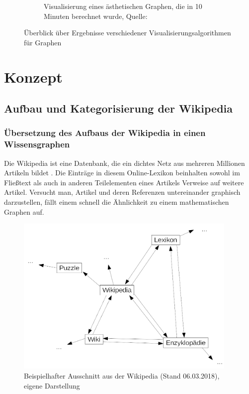 \documentclass[12pt, a4paper]{article}
\begin{document}
\begin{figure}[h!]
\begin{subfigure}[b]{0.45\textwidth}
\caption[Visualisierung eines ästhetischen Graphen, die in 10 Minuten berechnet wurde]{Visualisierung eines ästhetischen Graphen, die in 10 Minuten berechnet wurde, Quelle: \protect{}}
\label{Davidson_Harel_G1_10min}
\end{subfigure}
\caption{Überblick über Ergebnisse verschiedener Visualisierungsalgorithmen für Graphen}
\end{figure}

\newpage
\section{Konzept}
\subsection{Aufbau und Kategorisierung der Wikipedia}
\subsubsection{Übersetzung des Aufbaus der Wikipedia in einen Wissensgraphen}
Die Wikipedia ist eine Datenbank, die ein dichtes Netz aus mehreren Millionen Artikeln bildet \cite{Wiki:02}. Die Einträge in diesem Online-Lexikon beinhalten sowohl im Fließtext als auch in anderen Teilelementen eines Artikels Verweise auf weitere Artikel. Versucht man, Artikel und deren Referenzen untereinander graphisch darzustellen, fällt einem schnell die Ähnlichkeit zu einem mathematischen Graphen auf.\\

\begin{figure}[h!]
\centering
\includegraphics[width=0.95\textwidth]{Ausschnitt_Wikipedia.png}
\caption[Beispielhafter Ausschnitt aus der Wikipedia]{Beispielhafter Ausschnitt aus der Wikipedia (Stand 06.03.2018), eigene Darstellung}
\label{wikiAusschnitt}
\end{figure}
\end{document}
